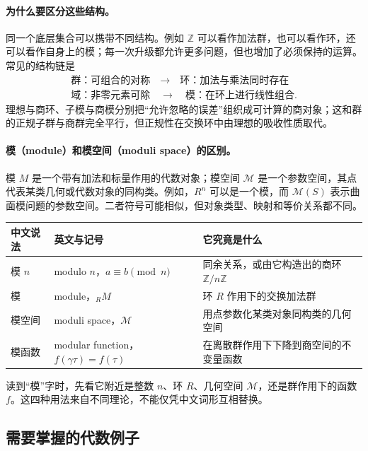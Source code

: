 \documentclass[UTF8,fontset=none,a4paper,11pt]{ctexart}
\theoremstyle{foundation-definition}
\theoremstyle{foundation-theorem}
\theoremstyle{foundation-proposition}
\theoremstyle{foundation-example}
\theoremstyle{foundation-remark}
\theoremstyle{foundation-theorem}
\begin{document}
\paragraph{为什么要区分这些结构。}
同一个底层集合可以携带不同结构。例如 \(\mathbb Z\) 可以看作加法群，也可以看作环，还可以看作自身上的模；每一次升级都允许更多问题，但也增加了必须保持的运算。常见的结构链是
\[
\begin{gathered}
\text{群：可组合的对称}\quad\longrightarrow\quad
\text{环：加法与乘法同时存在}\\
\text{域：非零元素可除}\quad\longrightarrow\quad
\text{模：在环上进行线性组合}.
\end{gathered}
\]
理想与商环、子模与商模分别把“允许忽略的误差”组织成可计算的商对象；这和群的正规子群与商群完全平行，但正规性在交换环中由理想的吸收性质取代。

\paragraph{模（module）和模空间（moduli space）的区别。}
模 \(M\) 是一个带有加法和标量作用的代数对象；模空间 \(\mathcal M\) 是一个参数空间，其点代表某类几何或代数对象的同构类。例如，\(R^n\) 可以是一个模，而 \(\mathcal M(S)\) 表示曲面模问题的参数空间。二者符号可能相似，但对象类型、映射和等价关系都不同。

\begin{center}
{\small
\setlength{\tabcolsep}{4pt}
\begin{tabularx}{\textwidth}{p{}|p{}|X}
\toprule
中文说法 & 英文与记号 & 它究竟是什么 \\
\midrule
模 \(n\) & modulo \(n\)，\(a\equiv b\pmod n\) & 同余关系，或由它构造出的商环 \(\mathbb Z/n\mathbb Z\) \\
模 & module，\({}_RM\) & 环 \(R\) 作用下的交换加法群 \\
模空间 & moduli space，\(\mathcal M\) & 用点参数化某类对象同构类的几何空间 \\
模函数 & modular function，\(f(\gamma\tau)=f(\tau)\) & 在离散群作用下下降到商空间的不变量函数 \\
\bottomrule
\end{tabularx}}
\end{center}

读到“模”字时，先看它附近是整数 \(n\)、环 \(R\)、几何空间 \(\mathcal M\)，还是群作用下的函数 \(f\)。这四种用法来自不同理论，不能仅凭中文词形互相替换。

\subsection{需要掌握的代数例子}
\end{document}
